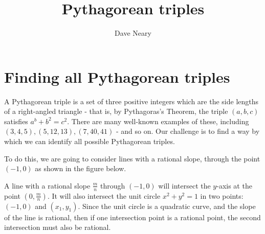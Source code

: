 \documentclass{article}
\begin{document}
\title{Pythagorean triples}
\author{Dave Neary}

\maketitle

\section{Finding all Pythagorean triples}

A Pythagorean triple is a set of three positive integers which 
are the side lengths of a right-angled triangle - that is, by
Pythagoras's Theorem, the triple $(a,b,c)$ satisfies 
$a^b + b^2 = c^2$. There are many well-known examples of these,
including $(3,4,5), (5,12,13), (7,40,41)$ - and so on. Our challenge
is to find a way by which we can identify all possible Pythagorean
triples.

To do this, we are going to consider lines with a rational slope, through the
point $(-1,0)$ as shown in the figure below.


A line with a rational slope $\frac{m}{n}$ through $(-1,0)$ will intersect 
the $y$-axis at the point $(0,\frac{m}{n})$. It will also intersect the
unit circle $x^2 + y^2 = 1$ in two points: $(-1,0)$ and $(x_1,y_1)$. Since
the unit circle is a quadratic curve, and the slope of the line is
rational, then if one intersection point is a rational point, the second
intersection must also be rational.
\end{document}
